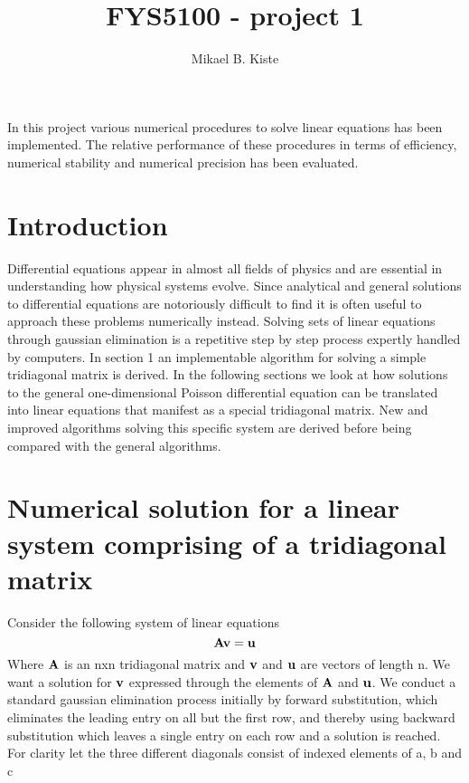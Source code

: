 \documentclass[10pt,a4paper]{article}
\author{Mikael B. Kiste}
\title{FYS5100 - project 1}
\begin{document}
    \maketitle
    
    \abstract In this project various numerical procedures to solve linear equations has been implemented. The relative performance of these procedures in terms of efficiency, numerical stability and numerical precision has been evaluated. 

    \tableofcontents

    \newpage
    \section{Introduction}
    Differential equations appear in almost all fields of physics and are essential in understanding how physical systems evolve. Since analytical and general solutions to differential equations are notoriously difficult to find it is often useful to approach these problems numerically instead. Solving sets of linear equations through gaussian elimination is a repetitive step by step process expertly handled by computers. In section 1 an implementable algorithm for solving a simple tridiagonal matrix is derived. In the following sections we look at how solutions to the general one-dimensional Poisson differential equation can be translated into linear equations that manifest as a special tridiagonal matrix. New and improved algorithms solving this specific system are derived before being compared with the general algorithms.

	\newpage
    \section{Numerical solution for a linear system comprising of a tridiagonal matrix}
    Consider the following system of linear equations
	$$\vb{Av} = \vb{u}$$
	Where $\vb{A}$ is an nxn tridiagonal matrix and $\vb{v}$ and $\vb{u}$ are vectors of length n.
    We want a solution for $\vb{v}$ expressed through the elements of $\vb{A}$ and $\vb{u}$.
    We conduct a standard gaussian elimination process initially by forward substitution, which eliminates the leading entry on all but the first row, and thereby using backward substitution which leaves a single entry on each row and a solution is reached. For clarity let the three different diagonals consist of indexed elements of a, b and c 
    
\end{document}
